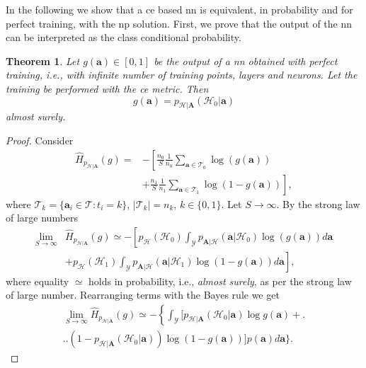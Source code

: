 \documentclass[conference,final]{IEEEtran}
\newcommand{\hatcross}[2]{\hat{H}_{#1}(#2)}
\newcommand{\gy}{g(\bm a)}
\newtheorem{theorem}{Theorem}
\begin{document}
In the following we show that a \ac{ce} based \ac{nn} is equivalent, in probability and for perfect training, with the \ac{np} solution. First, we prove that the output of the \ac{nn} can be interpreted as the class conditional probability. 
\begin{theorem}
Let $\gy \in [0,1]$ be the output of a \ac{nn} obtained with perfect training, i.e., with infinite number of training points, layers and neurons. Let the training be performed with the \ac{ce} metric. Then
\begin{equation}
	\gy = p_{\mathcal H|\bm A}(\mathcal{H}_0|\bm a)	
\end{equation}
almost surely.
\end{theorem}
\begin{proof}
Consider
\begin{equation}
\begin{split}
	\hatcross{ p_{\mathcal{H}|\bm A}}{g} =&  - \left[ \frac{n_0}{S} \frac{1}{n_0} \sum_{\bm a \in \mathcal{T}_0} \log(\gy) \right. \\
		&\left. + \frac{n_1}{S} \frac{1}{n_1} \sum_{\bm a \in \mathcal{T}_1} \log(1-\gy) \right],	
\end{split}
\end{equation}
where $\mathcal{T}_k = \{\bm a_i \in \mathcal{T} : t_i = k\}$, $|\mathcal{T}_k|=n_k$, $k \in \{0,1\}$.
Let $S \to \infty$. By the strong law of large numbers \cite{etemadi1981elementary}
\begin{equation}
\label{eq:as}
\begin{split}
	\lim_{S \to \infty}&	\hatcross{ p_{\mathcal{H}|\bm A}}{g} \simeq - \left[ p_{\mathcal H}(\mathcal{H}_0) \int_{\mathcal{Y}} p_{\bm A|\mathcal{H}}(\bm a|\mathcal{H}_0) \log (\gy) d\bm a \right. \\
	& \left. + p_{\mathcal{H}}(\mathcal{H}_1) \int_{\mathcal{Y}} p_{\bm A|\mathcal{H}}(\bm a|\mathcal{H}_1) \log (1-\gy) d\bm a \right],
\end{split}
\end{equation}
where equality $\simeq$ holds in probability, i.e., \textit{almost surely}, as per the strong law of large number.
Rearranging terms with the Bayes rule we get
\begin{equation}
\label{eq:dim1}
\begin{split}
\lim_{S \to \infty}	\hatcross{p_{\mathcal{H}|\bm A}}{g} \simeq - \left\{ \int_{\mathcal{Y}} \bigl[ p_{\mathcal{H}|\bm A}(\mathcal{H}_0|\bm a) \log \gy + \right. \bigr.\\ 
	\bigl. \bigl.(1-p_{\mathcal{H}|\bm A}(\mathcal{H}_0|\bm a)) \log(1-\gy)\bigr] p(\bm a)   d\bm a \biggr\}. 		

\end{split}
\end{equation}
\end{proof}
\end{document}
